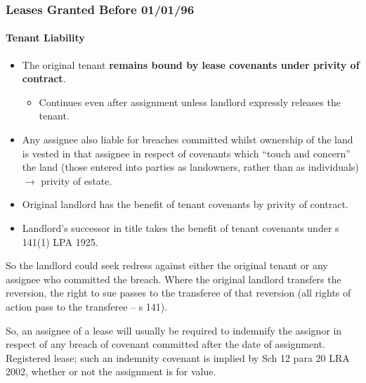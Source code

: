 \documentclass[
]{article}
\providecommand{\tightlist}{%
  \setlength{\itemsep}{0pt}\setlength{\parskip}{0pt}}
\begin{document}
\hypertarget{leases-granted-before-010196}{%
\subsubsection{Leases Granted Before
01/01/96}\label{leases-granted-before-010196}}

\hypertarget{tenant-liability}{%
\paragraph{Tenant Liability}\label{tenant-liability}}

\begin{itemize}
\tightlist
\item
  The original tenant \textbf{remains bound by lease covenants under
  privity of contract}.

  \begin{itemize}
  \tightlist
  \item
    Continues even after assignment unless landlord expressly releases
    the tenant.
  \end{itemize}
\item
  Any assignee also liable for breaches committed whilst ownership of
  the land is vested in that assignee in respect of covenants which
  ``touch and concern'' the land (those entered into parties as
  landowners, rather than as individuals) \(\rightarrow\) privity of
  estate.
\item
  Original landlord has the benefit of tenant covenants by privity of
  contract.
\item
  Landlord's successor in title takes the benefit of tenant covenants
  under s 141(1) LPA 1925.
\end{itemize}

So the landlord could seek redress against either the original tenant or
any assignee who committed the breach. Where the original landlord
transfers the reversion, the right to sue passes to the transferee of
that reversion (all rights of action pass to the transferee -- s 141).

So, an assignee of a lease will usually be required to indemnify the
assignor in respect of any breach of covenant committed after the date
of assignment. Registered lease; such an indemnity covenant is implied
by Sch 12 para 20 LRA 2002, whether or not the assignment is for value.
\end{document}
